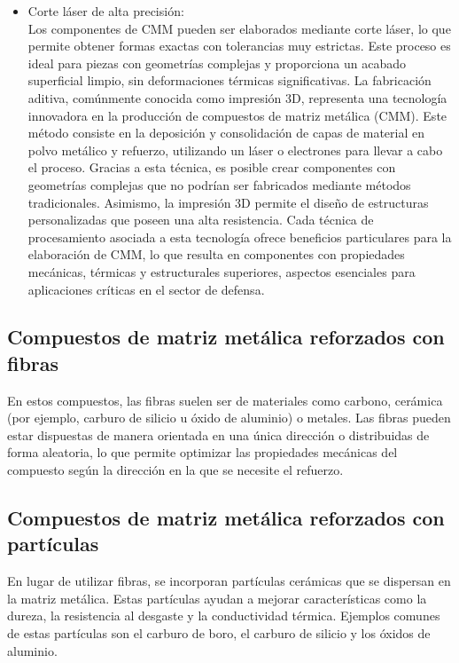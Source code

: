 \documentclass[letterpaper, 12pt]{article}
\begin{document}
\begin{itemize}
      \item Corte láser de alta precisión: \\ Los componentes de CMM pueden ser elaborados
            mediante corte láser, lo que permite obtener formas exactas con tolerancias muy
            estrictas. Este proceso es ideal para piezas con geometrías complejas y
            proporciona un acabado superficial limpio, sin deformaciones térmicas
            significativas. La fabricación aditiva, comúnmente conocida como impresión 3D,
            representa una tecnología innovadora en la producción de compuestos de matriz
            metálica (CMM). Este método consiste en la deposición y consolidación de capas
            de material en polvo metálico y refuerzo, utilizando un láser o electrones para
            llevar a cabo el proceso. Gracias a esta técnica, es posible crear componentes
            con geometrías complejas que no podrían ser fabricados mediante métodos
            tradicionales. Asimismo, la impresión 3D permite el diseño de estructuras
            personalizadas que poseen una alta resistencia. Cada técnica de procesamiento
            asociada a esta tecnología ofrece beneficios particulares para la elaboración
            de CMM, lo que resulta en componentes con propiedades mecánicas, térmicas y
            estructurales superiores, aspectos esenciales para aplicaciones críticas en el
            sector de defensa.

\end{itemize}

\subsection{Compuestos de matriz metálica reforzados con fibras}

En estos compuestos, las fibras suelen ser de materiales como carbono, cerámica
(por ejemplo, carburo de silicio u óxido de aluminio) o metales. Las fibras
pueden estar dispuestas de manera orientada en una única dirección o
distribuidas de forma aleatoria, lo que permite optimizar las propiedades
mecánicas del compuesto según la dirección en la que se necesite el refuerzo.

\subsection{Compuestos de matriz metálica reforzados con partículas}

En lugar de utilizar fibras, se incorporan partículas cerámicas que se
dispersan en la matriz metálica. Estas partículas ayudan a mejorar
características como la dureza, la resistencia al desgaste y la conductividad
térmica. Ejemplos comunes de estas partículas son el carburo de boro, el
carburo de silicio y los óxidos de aluminio.
\end{document}

